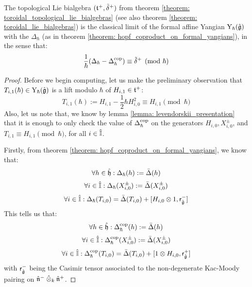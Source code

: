         \begin{theorem} \label{theorem: toroidal_lie_algebras_as_classical_limits_of_formal_affine_yangians}
           The topological Lie bialgebra $(\mathfrak{t}^{+}, \tilde{\delta}^{+})$ from theorem \ref{theorem: toroidal_topological_lie_bialgebras} (see also theorem \ref{theorem: toroidal_lie_bialgebras}) is the classical limit of the formal affine Yangian $\mathrm{Y}_{\hbar}(\hat{\mathfrak{g}})$ with the  $\Delta_{\hbar}$ (as in theorem \ref{theorem: hopf_coproduct_on_formal_yangians}), in the sense that:
                $$\frac{1}{\hbar}( \Delta_{\hbar} - \Delta_{\hbar}^{\mathrm{cop}} ) \equiv \tilde{\delta}^{+} \pmod{\hbar}$$
        \end{theorem}
            \begin{proof}
                Before we begin computing, let us make the preliminary observation that $T_{i, 1}(\hbar) \in \mathrm{Y}_{\hbar}(\hat{\mathfrak{g}})$ is a lift modulo $\hbar$ of $H_{i, 1} \in \mathfrak{t}^{+}$:
                    $$T_{i, 1}(\hbar) := H_{i, 1} - \frac12 \hbar H_{i, 0}^2 \equiv H_{i, 1} \pmod{\hbar}$$
                Also, let us note that, we know by lemma \ref{lemma: levendorskii_presentation} that it is enough to only check the value of $\Delta_{\hbar}^{\mathrm{cop}}$ on the generators $H_{i, 0}, X_{i, 0}^{\pm}$, and $T_{i, 1} \equiv H_{i, 1} \pmod{\hbar}$, for all $i \in \hat{\mathbb{I}}$.
            
                Firstly, from theorem \ref{theorem: hopf_coproduct_on_formal_yangians}, we know that:
                    $$\forall h \in \hat{\mathfrak{h}}: \Delta_{\hbar}(h) := \bar{\Delta}(h)$$
                    $$\forall i \in \hat{\mathbb{I}}: \Delta_{\hbar}(X_{i, 0}^{\pm}) := \bar{\Delta}(X_{i, 0}^{\pm})$$
                    $$\forall i \in \hat{\simpleroots}: \Delta_{\hbar}(T_{i, 0}) = \bar{\Delta}(T_{i, 0}) + [H_{i, 0} \tensor 1, \sfr_{ \hat{\g} }^-]$$
                This tells us that:
                    $$\forall h \in \hat{\mathfrak{h}}: \Delta_{\hbar}^{\mathrm{cop}}(h) := \bar{\Delta}(h)$$
                    $$\forall i \in \hat{\mathbb{I}}: \Delta_{\hbar}^{\mathrm{cop}}(X_{i, 0}^{\pm}) := \bar{\Delta}(X_{i, 0}^{\pm})$$
                    $$\forall i \in \hat{\simpleroots}: \Delta_{\hbar}^{\cop}(T_{i, 0}) = \bar{\Delta}(T_{i, 0}) + [1 \tensor H_{i, 0}, \sfr_{ \hat{\g} }^+]$$
                with $\mathsf{r}_{\hat{\mathfrak{g}}}^-$ being the Casimir tensor associated to the non-degenerate Kac-Moody pairing on $\hat{\n}^- \hattensor_k \hat{\n}^+$.


\end{proof}
